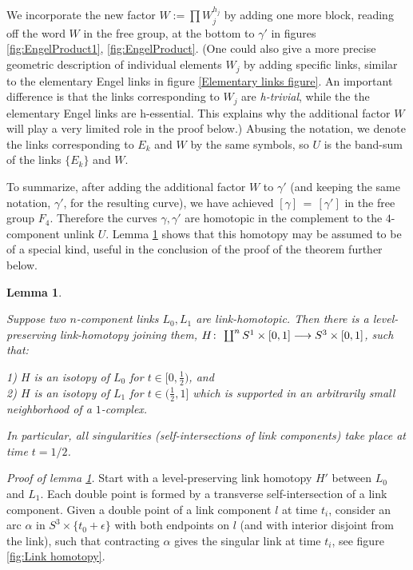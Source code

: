 \documentclass[12pt]{amsart}
\newtheorem{lemma}{Lemma}[section]
\theoremstyle{definition}
\theoremstyle{remark}
\numberwithin{equation}{section}
\theoremstyle{plain}
\theoremstyle{definition}
\newcommand{\co}{\colon\thinspace}
\numberwithin{figure}{section}
\begin{document}
We incorporate the new factor $W:=\prod W_j^{h_j}$ by adding one more block, reading off the word $W$ in the free group,  at the bottom to ${\gamma}'$ in figures \ref {fig:EngelProduct1}, \ref {fig:EngelProduct}. (One could also give a more precise geometric description of individual elements $W_j$ by adding specific links, similar to the elementary Engel links in figure \ref{Elementary links figure}. An important difference is that the links corresponding to $W_j$ are {\em h-trivial}, while the the elementary Engel links are h-essential. This explains why the additional factor $W$ will play a very limited role in the proof below.) Abusing the notation, we denote the links corresponding to $E_k$ and $W$ by the same symbols, so $U$ is the band-sum of the links $\{ E_k\}$ and $W$.

To summarize, after adding the additional factor $W$ to ${\gamma}'$ (and keeping the same notation, ${\gamma}'$, for the resulting curve), we have achieved $[{\gamma}]\, =\, [{\gamma}']$ in the free group $F_4$. Therefore the curves ${\gamma}, {\gamma}'$  are homotopic in the complement to the $4$-component unlink $U$. Lemma \ref{link homotopy lemma} shows that this homotopy may be assumed to be of a special kind, useful in the conclusion of the proof of the theorem further below.












\begin{lemma} \label{link homotopy lemma} {\sl
Suppose two $n$-component links $L_0, L_1$ are link-homotopic. Then there is a level-preserving link-homotopy joining them, $H\co \coprod^n S^1 \times [0,1]\longrightarrow S^3\times [0,1]$,  such that: 

1) $H$ is an isotopy  of $L_0$ for $t\in[0,\frac{1}{2})$, and \\
2) $H$ is an isotopy of $L_1$ for $t\in(\frac{1}{2},1]$ which is supported in an arbitrarily small neighborhood of a $1$-complex.

In particular, all singularities (self-intersections of link components) take place at time $t=1/2$.}
\end{lemma}

{\em Proof of lemma \ref{link homotopy lemma}.} Start with a level-preserving link homotopy $H'$ between $L_0$ and $L_1$. Each double point is formed by a transverse self-intersection of a link component. Given a double point of a link component $l$ at time $t_i$, consider an arc ${\alpha}$ in $S^3\times \{t_0+{\epsilon} \}$ with both endpoints on $l$ (and with interior disjoint from the link), such that contracting ${\alpha}$ gives the singular link at time $t_i$, see figure \ref{fig:Link homotopy}. 
\end{document}
